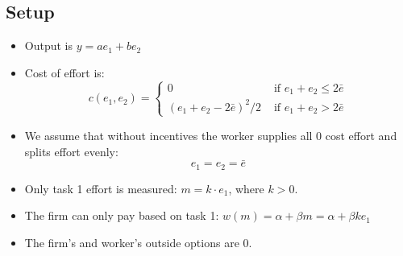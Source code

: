 \documentclass{article}
\begin{document}
\subsection{Setup}
\begin{itemize}
    \item Output is $y=a e_1+b e_2$
    \item Cost of effort is:
       \[c(e_1, e_2) = \begin{cases}
            0 & \text{ if }  e_1+e_2 \leq 2 \bar e \\
            (e_1+e_2-2\bar e)^2/2 & \text{ if } e_1+e_2 > 2 \bar e 
        \end{cases}\]
      \item We assume that without incentives the worker supplies all 0 cost effort and splits effort evenly:
      \[e_1=e_2=\bar e\]
    \item Only task 1 effort is measured: $m=k \cdot e_1$, where $k>0$.
    \item The firm can only pay based on task 1: $w(m)=\alpha + \beta  m =\alpha + \beta k e_1$
    \item The firm's and worker's outside options are 0.
\end{itemize}
\end{document}
